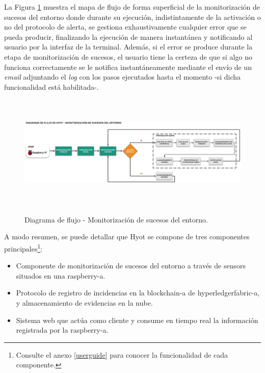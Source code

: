 \documentclass[12pt,a4paper, twoside]{report}
\begin{document}
	La Figura \ref{fig:hyot_flow} muestra el mapa de flujo de forma superficial de la monitorización de sucesos del entorno donde durante su ejecución, indistintamente de la activación o no del protocolo de alerta, se gestiona exhaustivamente cualquier error que se pueda producir, finalizando la ejecución de manera instantánea y notificando al usuario por la interfaz de la terminal. Además, si el error se produce durante la etapa de monitorización de sucesos, el usuario tiene la certeza de que si algo no funciona correctamente se le notifica instantáneamente mediante el envío de un \textit{email} adjuntando el \textit{log} con los pasos ejecutados hasta el momento -si dicha funcionalidad está habilitada-.
	
		\begin{figure}[!ht]   
			\caption{Diagrama de flujo - Monitorización de sucesos del entorno.} 
			\begin{center} 
	 			\includegraphics[width=18cm,height=5.5cm]{Images/implement/hyot_flow} \\
				\label{fig:hyot_flow} 
			\end{center}  
		\end{figure}

	A modo resumen, se puede detallar que Hyot se compone de tres componentes principales\footnote{Consulte el anexo \ref{userguide} para conocer la funcionalidad de cada componente.}:

	\begin{itemize}
  		\item Componente de monitorización de sucesos del entorno a través de \glspl{sensor} situados en una \gls{raspberry-a}.
  		\item Protocolo de registro de incidencias en la \gls{blockchain-a} de \gls{hyperledgerfabric-a}, y almacenamiento de evidencias en la nube. 
  		\item Sistema web que actúa como cliente y consume en tiempo real la información registrada por la \gls{raspberry-a}.
	\end{itemize}
\end{document}
